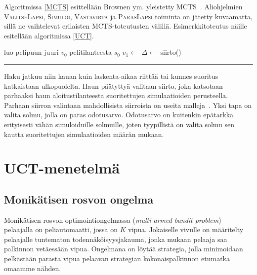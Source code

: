 \documentclass[12pt,finnish]{tktltiki2}
\theoremstyle{definition}
\theoremstyle{remark}
\begin{document}
Algoritmissa \ref{MCTS} esittellään Brownen ym. yleistetty MCTS~\cite{browne}. Aliohjelmien \textsc{ValitseLapsi}, \textsc{Simuloi}, \textsc{Vastavirta} ja \textsc{ParasLapsi} toiminta on jätetty kuvaamatta, sillä ne vaihtelevat erilaisten MCTS-toteutusten välillä. Esimerkkitoteutus näille esitellään algoritmissa \ref{UCT}.
\newpage
\begin{samepage}
\begin{center}
\label{MCTS}
\begin{algorithmic}[0]
	\State luo pelipuun juuri $v_0$ pelitilanteesta $s_0$
		\State $v_1 \leftarrow$ 
		\State $\Delta \leftarrow$ 
		\State {}
	\EndWhile
	\State \Return siirto()
\EndFunction
\end{algorithmic}
\rule{\textwidth}{1pt}
\end{center}
\end{samepage}

Haku jatkuu niin kauan kuin laskenta-aikaa riittää tai kunnes suoritus katkaistaan ulkopuolelta. Haun päätyttyä valitaan siirto, joka katsotaan parhaaksi haun aloitustilanteesta suoritettujen simulaatioiden perusteella. Parhaan siirron valintaan mahdollisista siirroista on useita malleja~\cite{browne}. Yksi tapa on valita solmu, jolla on paras odotusarvo. Odotusarvo on kuitenkin epätarkka erityisesti vähän simuloiduille solmuille, joten tyypillistä on valita solmu sen kautta suoritettujen simulaatioiden määrän mukaan.

\section{UCT-menetelmä}

\subsection{Monikätisen rosvon ongelma}

Monikätisen rosvon optimointiongelmassa (\textit{multi-armed bandit problem})~\cite{browne} pelaajalla on peliautomaatti, jossa on $K$ vipua. Jokaiselle vivulle on määritelty pelaajalle tuntematon todennäköisyysjakauma, jonka mukaan pelaaja saa palkinnon vetäessään vipua. Ongelmana on löytää strategia, jolla minimoidaan pelkästään parasta vipua pelaavan strategian kokonaispalkinnon etumatka omaamme nähden.
\end{document}
